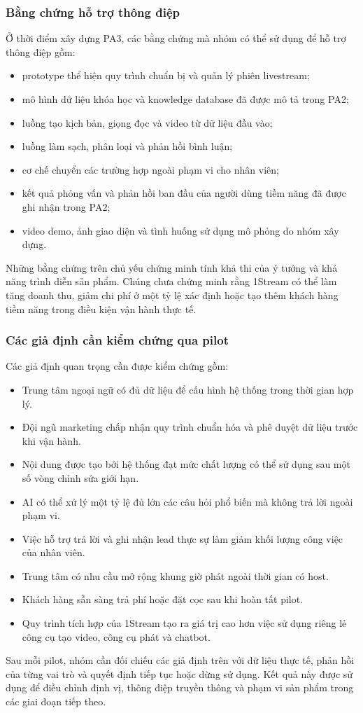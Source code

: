 \subsubsection{Bằng chứng hỗ trợ thông điệp}

Ở thời điểm xây dựng PA3, các bằng chứng mà nhóm có thể sử dụng để hỗ trợ thông điệp gồm:

\begin{itemize}
    \item prototype thể hiện quy trình chuẩn bị và quản lý phiên livestream;
    \item mô hình dữ liệu khóa học và knowledge database đã được mô tả trong PA2;
    \item luồng tạo kịch bản, giọng đọc và video từ dữ liệu đầu vào;
    \item luồng làm sạch, phân loại và phản hồi bình luận;
    \item cơ chế chuyển các trường hợp ngoài phạm vi cho nhân viên;
    \item kết quả phỏng vấn và phản hồi ban đầu của người dùng tiềm năng đã được ghi nhận trong PA2;
    \item video demo, ảnh giao diện và tình huống sử dụng mô phỏng do nhóm xây dựng.
\end{itemize}

Những bằng chứng trên chủ yếu chứng minh tính khả thi của ý tưởng và khả năng trình diễn sản phẩm. Chúng chưa chứng minh rằng 1Stream có thể làm tăng doanh thu, giảm chi phí ở một tỷ lệ xác định hoặc tạo thêm khách hàng tiềm năng trong điều kiện vận hành thực tế.

\subsubsection{Các giả định cần kiểm chứng qua pilot}

Các giả định quan trọng cần được kiểm chứng gồm:

\begin{itemize}
    \item Trung tâm ngoại ngữ có đủ dữ liệu để cấu hình hệ thống trong thời gian hợp lý.
    \item Đội ngũ marketing chấp nhận quy trình chuẩn hóa và phê duyệt dữ liệu trước khi vận hành.
    \item Nội dung được tạo bởi hệ thống đạt mức chất lượng có thể sử dụng sau một số vòng chỉnh sửa giới hạn.
    \item AI có thể xử lý một tỷ lệ đủ lớn các câu hỏi phổ biến mà không trả lời ngoài phạm vi.
    \item Việc hỗ trợ trả lời và ghi nhận lead thực sự làm giảm khối lượng công việc của nhân viên.
    \item Trung tâm có nhu cầu mở rộng khung giờ phát ngoài thời gian có host.
    \item Khách hàng sẵn sàng trả phí hoặc đặt cọc sau khi hoàn tất pilot.
    \item Quy trình tích hợp của 1Stream tạo ra giá trị cao hơn việc sử dụng riêng lẻ công cụ tạo video, công cụ phát và chatbot.
\end{itemize}

Sau mỗi pilot, nhóm cần đối chiếu các giả định trên với dữ liệu thực tế, phản hồi của từng vai trò và quyết định tiếp tục hoặc dừng sử dụng. Kết quả này được sử dụng để điều chỉnh định vị, thông điệp truyền thông và phạm vi sản phẩm trong các giai đoạn tiếp theo.